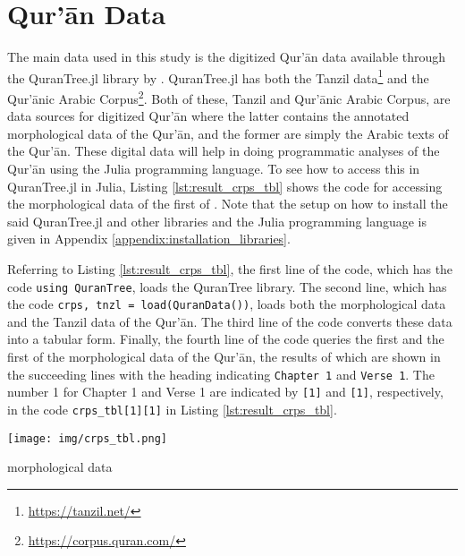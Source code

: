 \section{Qur'\=an Data}\label{sec:result_data}
The main data used in this study is the digitized Qur'\=an data available through the QuranTree.jl library by . QuranTree.jl has both the Tanzil data\footnote{\url{https://tanzil.net/}} and the Qur'\=anic Arabic Corpus\footnote{\url{https://corpus.quran.com/}}. Both of these, Tanzil and Qur'\=anic Arabic Corpus, are data sources for digitized Qur'\=an where the latter contains the annotated morphological data of the Qur'\=an, and the former are simply the Arabic texts of the Qur'\=an. These digital data will help in doing programmatic analyses of the Qur'\=an using the Julia programming language. To see how to access this in QuranTree.jl in Julia, Listing \ref{lst:result_crps_tbl} shows the code for accessing the morphological data of the first   of  . Note that the setup on how to install the said QuranTree.jl and other libraries and the Julia programming language is given in Appendix \ref{appendix:installation_libraries}.

Referring to Listing \ref{lst:result_crps_tbl}, the first line of the code, which has the code \texttt{using QuranTree}, loads the QuranTree library. The second line, which has the code \texttt{crps, tnzl = load(QuranData())}, loads both the morphological data and the Tanzil data of the Qur'\=an. The third line of the code converts these data into a tabular form. Finally, the fourth line of the code queries the first   and the first   of the morphological data of the Qur'\=an, the results of which are shown in the succeeding lines with the heading indicating \texttt{Chapter 1} and \texttt{Verse 1}. The number 1 for Chapter 1 and Verse 1 are indicated by \texttt{[1]} and \texttt{[1]}, respectively, in the code \verb|crps_tbl[1][1]| in Listing \ref{lst:result_crps_tbl}.

\begin{listing2}[!t]
    \centering
    \texttt{[image: img/crps\_tbl.png]}
    \caption{  morphological data}
    \label{lst:result_crps_tbl}
\end{listing2}

